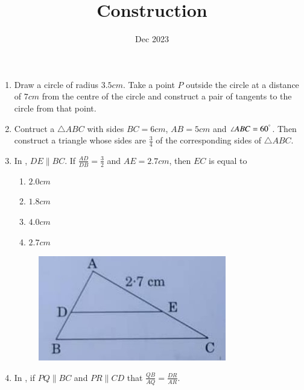 \documentclass[12pt,-letter paper]{article}
\title{Construction}
\date{Dec 2023}
\begin{document}
\maketitle

\begin{enumerate}
	\item Draw a circle of radius $3.5 cm$. Take a point $P$ outside the circle at a distance of $7 cm$ from the centre of the circle and construct a pair of tangents to the circle from that point.
	\item Contruct a $\triangle ABC $ with sides $BC = 6 cm$, $AB = 5 cm$ and $\angle ABC = 60^\degree$. Then construct a triangle whose sides are $\frac{3}{4}$ of the corresponding sides of $\triangle ABC$.
	\item In , $DE \parallel BC $. If $\frac{AD}{DB}=\frac{3}{2}$ and $AE = 2.7 cm$, then $EC$ is equal to
		\begin{enumerate}
		\item $2.0 cm$ 
                \item $1.8 cm$
		\item $4.0 cm$
		\item $2.7 cm$
		\end{enumerate}
		\begin{figure}[!ht]
			\begin{center}
				\includegraphics[width=\columnwidth]{figs/Construction-1.jpg}
			\end{center}
			\caption{}
			\label{fig:Construction-1.jpg}
		\end{figure}
		\newpage
	\item In , if $PQ \parallel BC$ and $PR \parallel CD$ that $\frac{QB}{AQ} = \frac{DR}{AR}$.




\end{enumerate}
\end{document}
